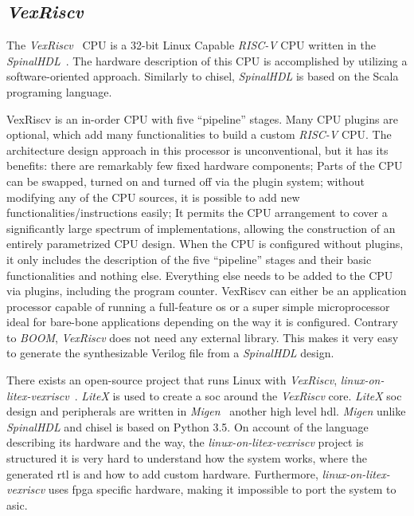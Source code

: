 \subsection{\textit{VexRiscv}}
The \textit{VexRiscv}~\cite{vexriscv} CPU is a 32-bit Linux Capable \textit{RISC-V} CPU written in the \textit{SpinalHDL}~\cite{papon2017spinalhdl}. The hardware description of this CPU is accomplished by utilizing a software-oriented approach. Similarly to \acrshort{chisel}, \textit{SpinalHDL} is based on the Scala programing language.

VexRiscv is an in-order CPU with five \enquote{pipeline} stages. Many CPU plugins are optional, which add many functionalities to build a custom \textit{RISC-V} CPU. The architecture design approach in this processor is unconventional, but it has its benefits: there are remarkably few fixed hardware components; Parts of the CPU can be swapped, turned on and turned off via the plugin system; without modifying any of the CPU sources, it is possible to add new functionalities/instructions easily; It permits the CPU arrangement to cover a significantly large spectrum of implementations, allowing the construction of an entirely parametrized CPU design. When the CPU is configured without plugins, it only includes the description of the five \enquote{pipeline} stages and their basic functionalities and nothing else. Everything else needs to be added to the CPU via plugins, including the program counter. VexRiscv can either be an application processor capable of running a full-feature \acrfull{os} or a super simple microprocessor ideal for bare-bone applications depending on the way it is configured. Contrary to \textit{BOOM}, \textit{VexRiscv} does not need any external library. This makes it very easy to generate the synthesizable Verilog file from a \textit{SpinalHDL} design.

There exists an open-source project that runs Linux with \textit{VexRiscv}, \textit{linux-on-litex-vexriscv}~\cite{litex_vexriscv}. \textit{LiteX} is used to create a \acrfull{soc} around the \textit{VexRiscv} core. \textit{LiteX} \acrshort{soc} design and peripherals are written in \textit{Migen}~\cite{bourdeauducq2012migen} another high level \acrshort{hdl}. \textit{Migen} unlike \textit{SpinalHDL} and  \acrshort{chisel} is based on Python 3.5. On account of the language describing its hardware and the way, the \textit{linux-on-litex-vexriscv} project is structured it is very hard to understand how the system works, where the generated \acrshort{rtl} is and how to add custom hardware. Furthermore, \textit{linux-on-litex-vexriscv} uses \acrshort{fpga} specific hardware, making it impossible to port the system to \acrshort{asic}.

